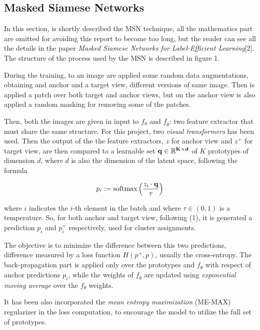 \documentclass[column]{article}
\begin{document}
\begin{multicols}{2}
	
	\section{Masked Siamese Networks}
	In this section, is shortly described the MSN technique, all the mathematics part are omitted for avoiding this report to become too long, but the reader can see all the details in the paper \textit{Masked Siamese Networks for Label-Efficient Learning}[2]. The structure of the process used by the MSN is described in figure 1. 
	
	During the training, to an image are applied some random data augmentations, obtaining and anchor and a target view, different versions of same image. Then is applied a patch over both target and anchor views, but on the anchor view is also applied a random masking for removing some of the patches. 
	
	Then, both the images are given in input to $f_\theta$ and $f_{\overline{\theta}}$: two feature extractor that must share the same structure. For this project, two \textit{visual transformers} has been used. Then the output of the the feature extractors, $z$ for anchor view and $z^+$ for target view, are then compared to a learnable set $\bf q \in \mathbb{R}^{K \times d}$ of $K$ prototypes of dimension $d$, where $d$ is also the dimension of the latent space, following the formula
	
	\begin{equation}
		p_{i} := \textnormal{softmax}\left(\frac{z_i \cdot \bf q}{\tau}\right)
	\end{equation}
	
	where $i$ indicates the $i$-th element in the batch and where $\tau\in(0,1)$ is a temperature. So, for both anchor and target view, following (1), it is generated a prediction $p_i$ and $p_i^+$ respectively, used for cluster assignments.
	
	The objective is to minimize the difference between this two predictions, difference measured by a loss function $H(p^+, p)$, usually the cross-entropy. The back-propagation part is applied only over the prototypes and $f_\theta$ with respect of anchor predictions $p_i$, while the weights of $f_{\overline{\theta}}$ are updated using \textit{exponential moving average} over the $f_\theta$ weights. 
	
	It has been also incorporated the \textit{mean entropy maximization} (ME-MAX) regularizer in the loss computation,  to encourage the model to utilize the full set of prototypes.
	
	\end{multicols}
	
\end{document}
